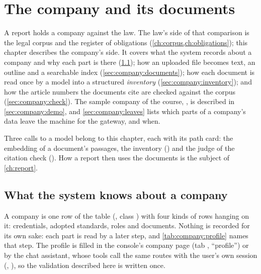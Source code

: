 \chapter{The company and its documents}\label{ch:company}

A report holds a company against the law. The law's side of that comparison is the legal corpus
and the register of obligations (\cref{ch:corpus,ch:obligations}); this chapter describes the
company's side. It covers what the system records about a company and why each part is there
(\cref{sec:company:profile}); how an uploaded file becomes text, an outline and a searchable
index (\cref{sec:company:documents}); how each document is read once by a model into a
structured \emph{inventory} (\cref{sec:company:inventory}); and how the article numbers the
documents cite are checked against the corpus (\cref{sec:company:check}). The sample company
of the course, \demo, is described in \cref{sec:company:demo}, and \cref{sec:company:leaves}
lists which parts of a company's data leave the machine for the gateway, and when.

Three calls to a model belong to this chapter, each with its path card: the embedding of a
document's passages, the inventory () and the judge of the citation
check (). How a report then uses the documents is the subject
of \cref{ch:report}.


\section{What the system knows about a company}\label{sec:company:profile}

A company is one row of the table  (, class
) with four kinds of rows hanging on it: credentials, adopted standards, roles
and documents. Nothing is recorded for its own sake: each part is read by a later step, and
\cref{tab:company:profile} names that step. The profile is filled in the console's company
page (tab , \enquote{profile}) or by the chat assistant, whose tools call the same
routes with the user's own session (,
), so the validation described here is written once.

